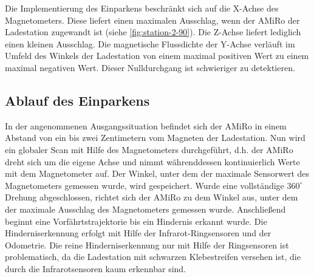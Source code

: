 Die Implementierung des Einparkens beschränkt sich auf die X-Achse des Magnetometers. Diese liefert einen maximalen Ausschlag, wenn der AMiRo der Ladestation zugewandt ist (siehe \ref{fig:station-2-90}). Die Z-Achse liefert lediglich einen kleinen Ausschlag. Die magnetische Flussdichte der Y-Achse verläuft im Umfeld des Winkels der Ladestation von einem maximal positiven Wert zu einem maximal negativen Wert. Dieser Nulldurchgang ist schwieriger zu detektieren.


\begin{figure}
	\caption{}
	\label{fig:messdaten}
\end{figure}

\subsection{Ablauf des Einparkens}
In der angenommenen Ausgangssituation befindet sich der AMiRo in einem Abstand von ein bis zwei Zentimetern vom Magneten der Ladestation. Nun wird ein globaler Scan mit Hilfe des Magnetometers durchgeführt, d.h. der AMiRo dreht sich um die eigene Achse und nimmt währenddessen kontinuierlich Werte mit dem Magnetometer auf. Der Winkel, unter dem der maximale Sensorwert des Magnetometers gemessen wurde, wird gespeichert. Wurde eine vollständige $360^\circ$ Drehung abgeschlossen, richtet sich der AMiRo zu dem Winkel aus, unter dem der maximale Ausschlag des Magnetometers gemessen wurde. Anschließend beginnt eine Vorfährtstrajektorie bis ein Hindernis erkannt wurde. Die Hinderniserkennung erfolgt mit Hilfe der Infrarot-Ringsensoren und der Odometrie. Die reine Hinderniserkennung nur mit Hilfe der Ringsensoren ist problematisch, da die Ladestation mit schwarzen Klebestreifen versehen ist, die durch die Infrarotsensoren kaum erkennbar sind.


